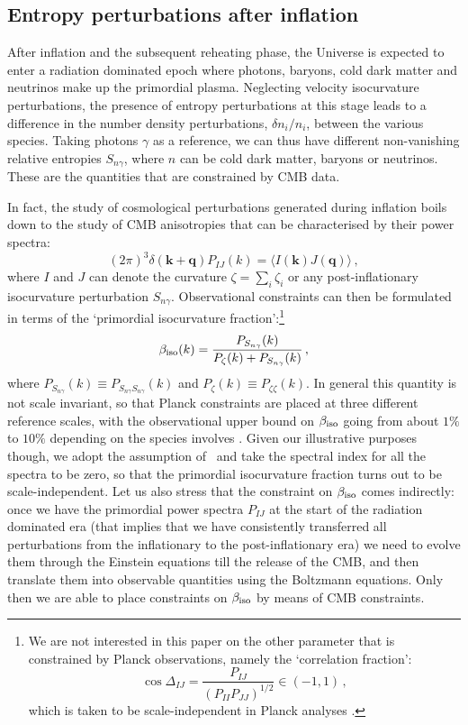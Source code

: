 \documentclass[a4paper,11pt]{article}
\def\be{\begin{equation}}
\def\ee{\end{equation}}
\begin{document}
\subsection{Entropy perturbations after inflation}
\label{sec:PerturbationsAfterInflation}

After inflation and the subsequent reheating phase, the Universe is expected to enter a radiation dominated epoch where photons, baryons, cold dark matter and neutrinos make up the primordial plasma. Neglecting velocity isocurvature perturbations, the presence of entropy perturbations at this stage leads to a difference in the number density perturbations, $\delta n_i/n_i$, between the various species. Taking photons $\gamma$ as a reference, we can thus have different non-vanishing relative entropies $S_{n\gamma}$, where $n$ can be cold dark matter, baryons or neutrinos. These are the quantities that are constrained by CMB data.

In fact, the study of cosmological perturbations generated during inflation boils down to the study of CMB anisotropies that can be characterised by their power spectra:
\be
(2\pi)^3 \delta(\mathbf{k} + \mathbf{q}) P_{IJ}(k) = \langle I(\mathbf{k}) J(\mathbf{q})\rangle \,,
\ee
where $I$ and $J$ can denote the curvature $\zeta = \sum_i \zeta_i$ or any post-inflationary isocurvature perturbation $S_{n\gamma}$. Observational constraints can then be formulated in terms of the `primordial isocurvature fraction':\footnote{We are not interested in this paper on the other parameter that is constrained by Planck observations, namely the `correlation fraction':
\be
\cos\Delta_{IJ} = \frac{P_{IJ}}{(P_{II} P_{JJ})^{1/2}} \in (-1, 1) \,,
\ee
which is taken to be scale-independent in Planck analyses \cite{Akrami:2018odb}.}
\be
\beta_{\rm iso}(k) = \frac{P_{S_{n\gamma}}(k)}{P_\zeta (k) + P_{S_{n\gamma}}(k)} \,, 
\ee
where $P_{S_{n\gamma}}(k)\equiv P_{S_{n\gamma}S_{n\gamma}} (k)$ and $P_\zeta(k)\equiv P_{\zeta \zeta}(k)$. In general this quantity is not scale invariant, so that Planck constraints are placed at three different reference scales, with the observational upper bound on $\beta_{\rm iso}$ going from about $1\%$ to $10\%$ depending on the species involves \cite{Akrami:2018odb}. Given our illustrative purposes though, we adopt the assumption of~\cite{Montandon:2020kuk} and take the spectral index for all the spectra to be zero, so that the primordial isocurvature fraction turns out to be scale-independent. Let us also stress that the constraint on $\beta_{\rm iso}$ comes indirectly: once we have the primordial power spectra $P_{IJ}$ at the start of the radiation dominated era (that implies that we have consistently transferred all perturbations from the inflationary to the post-inflationary era) we need to evolve them through the Einstein equations till the release of the CMB, and then translate them into observable quantities using the Boltzmann equations. Only then we are able to place constraints on $\beta_{\rm iso}$ by means of CMB constraints.
\end{document}
